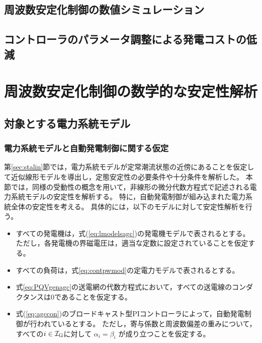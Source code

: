 \documentclass[tombow,dvipdfmx]{corona-a5-1.1}
\begin{document}
\subsection{周波数安定化制御の数値シミュレーション}



\subsection{コントローラのパラメータ調整による発電コストの低減}\label{sec:conpeco}




\section{周波数安定化制御の数学的な安定性解析\advanced}

\subsection{対象とする電力系統モデル}\label{sec:objmod}

\subsubsection{電力系統モデルと自動発電制御に関する仮定}

第\ref{sec:stalin}節では，電力系統モデルが定常潮流状態の近傍にあることを仮定して近似線形モデルを導出し，定態安定性の必要条件や十分条件を解析した。
本節では，同様の受動性の概念を用いて，非線形の微分代数方程式で記述される電力系統モデルの安定性を解析する。
特に，自動発電制御が組み込まれた電力系統全体の安定性を考える。
具体的には，以下のモデルに対して安定性解析を行う。
\begin{itemize}
\item すべての発電機は，式(\ref{eq:lmodelsagc})の発電機モデルで表されるとする。
ただし，各発電機の界磁電圧は，適当な定数に設定されていることを仮定する。
\item すべての負荷は，式\ref{eq:contpwmod}の定電力モデルで表されるとする。
\item 式\ref{eq:PQVgenagc}の送電網の代数方程式において，すべての送電線のコンダクタンスは0であることを仮定する。
\item 式(\ref{eq:agccon})のブロードキャスト型PIコントローラによって，自動発電制御が行われているとする。
ただし，寄与係数と周波数偏差の重みについて，すべての$i\in \mathcal{I}_{\rm G}$に対して
$\alpha_i = \beta_i $
が成り立つことを仮定する。
\end{itemize}
\end{document}
